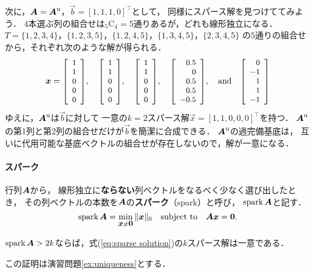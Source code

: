 次に，$\mbox{\boldmath $A$}=\mbox{\boldmath $A$}^{\mbox{\scriptsize u}}$，$\vec b=[1,1,1,0]^\top$として，
同様にスパース解を見つけててみよう．
$4$本選ぶ列の組合せは${}_5$C${}_4=5$通りあるが，どれも線形独立になる．
$T=\{1,2,3,4\}$，$\{1,2,3,5\}$，$\{1,2,4,5\}$，$\{1,3,4,5\}$，$\{2,3,4,5\}$
の$5$通りの組合せから，それぞれ次のような解が得られる．
\begin{equation}
\vec x=
\smatrix{\small}{r}{1 \\ 1 \\ 0 \\ 0 \\ 0},\quad
\smatrix{\small}{r}{1 \\ 1 \\ 0 \\ 0 \\ 0},\quad
\smatrix{\small}{r}{1 \\ 1 \\ 0 \\ 0 \\ 0},\quad
\smatrix{\small}{r}{0.5 \\ 0 \\ 0.5 \\ 0.5 \\ -0.5},\quad\mbox{and}\quad
\smatrix{\small}{r}{0 \\ -1 \\ 1 \\ 1 \\ -1}
\label{eq:solutions to A5}
\end{equation}
ゆえに，$\mbox{\boldmath $A$}^{\mbox{\scriptsize u}}$は$\vec b$に対して
一意の$k=2$スパース解$\vec x=[1,1,0,0,0]^\top$を持つ．
$\mbox{\boldmath $A$}^{\mbox{\scriptsize u}}$の第1列と第2列の組合せだけが$\vec b$を簡潔に合成できる．
$\mbox{\boldmath $A$}^{\mbox{\scriptsize u}}$の過完備基底は，
互いに代用可能な基底ベクトルの組合せが存在しないので，解が一意になる．




\paragraph{スパーク}
\begin{definition}
行列$\mbox{\boldmath $A$}$から，
線形独立に{\bf ならない}列ベクトルをなるべく少なく選び出したとき，
その列ベクトルの本数を$\mbox{\boldmath $A$}$の{\bf スパーク}（spark）と呼び，
$\mathop{\textrm{spark}}\nolimits\mbox{\boldmath $A$}$と記す．
\begin{equation}
 \mathop{\textrm{spark}}\nolimits\mbox{\boldmath $A$}=\min_{\small\mbox{\boldmath $x$}\neq\mbox{\boldmath $0$}}\|\mbox{\boldmath $x$}\|_0
\quad\mbox{subject to}\quad\mbox{\boldmath $A$}\mbox{\boldmath $x$}=\mbox{\boldmath $0$}.
\end{equation}
\end{definition}
\begin{theorem}
\label{th:uniqueness}
$\mathop{\textrm{spark}}\nolimits\mbox{\boldmath $A$}>2k$ならば，式(\ref{eq:sparse solution})の$k$スパース解は一意である．
\end{theorem}
\noindent
この証明は演習問題\ref{ex:uniqueness}とする．

